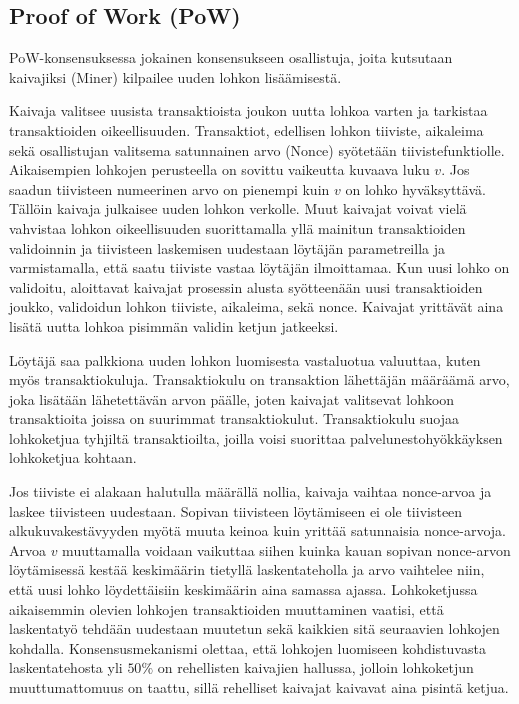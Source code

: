 \subsection{Proof of Work (PoW)}
PoW-konsensuksessa jokainen konsensukseen osallistuja, joita kutsutaan kaivajiksi (Miner) kilpailee uuden lohkon lisäämisestä.

Kaivaja valitsee uusista transaktioista joukon uutta lohkoa varten ja tarkistaa transaktioiden oikeellisuuden. Transaktiot, edellisen lohkon tiiviste, aikaleima sekä osallistujan valitsema satunnainen arvo (Nonce) syötetään tiivistefunktiolle. Aikaisempien lohkojen perusteella on sovittu vaikeutta kuvaava luku $v$. Jos saadun tiivisteen numeerinen arvo on pienempi kuin $v$ on lohko hyväksyttävä. Tällöin kaivaja julkaisee uuden lohkon verkolle. Muut kaivajat voivat vielä vahvistaa lohkon oikeellisuuden suorittamalla yllä mainitun transaktioiden validoinnin ja tiivisteen laskemisen uudestaan löytäjän parametreilla ja varmistamalla, että saatu tiiviste vastaa löytäjän ilmoittamaa. Kun uusi lohko on validoitu, aloittavat kaivajat prosessin alusta syötteenään uusi transaktioiden joukko, validoidun lohkon tiiviste, aikaleima, sekä nonce. Kaivajat yrittävät aina lisätä uutta lohkoa pisimmän validin ketjun jatkeeksi. 

Löytäjä saa palkkiona uuden lohkon luomisesta vastaluotua valuuttaa, kuten myös transaktiokuluja. Transaktiokulu on transaktion lähettäjän määräämä arvo, joka lisätään lähetettävän arvon päälle, joten kaivajat valitsevat lohkoon transaktioita joissa on suurimmat transaktiokulut. Transaktiokulu suojaa lohkoketjua tyhjiltä transaktioilta, joilla voisi suorittaa palvelunestohyökkäyksen lohkoketjua kohtaan.

Jos tiiviste ei alakaan halutulla määrällä nollia, kaivaja vaihtaa nonce-arvoa ja laskee tiivisteen uudestaan. Sopivan tiivisteen löytämiseen ei ole tiivisteen alkukuvakestävyyden myötä muuta keinoa kuin yrittää satunnaisia nonce-arvoja. Arvoa $v$ muuttamalla voidaan vaikuttaa siihen kuinka kauan sopivan nonce-arvon löytämisessä kestää keskimäärin tietyllä laskentateholla ja arvo vaihtelee niin, että uusi lohko löydettäisiin keskimäärin aina samassa ajassa. Lohkoketjussa aikaisemmin olevien lohkojen transaktioiden muuttaminen vaatisi, että laskentatyö tehdään uudestaan muutetun sekä kaikkien sitä seuraavien lohkojen kohdalla. Konsensusmekanismi olettaa, että lohkojen luomiseen kohdistuvasta laskentatehosta yli $50\%$ on rehellisten kaivajien hallussa, jolloin lohkoketjun muuttumattomuus on taattu, sillä rehelliset kaivajat kaivavat aina pisintä ketjua.

